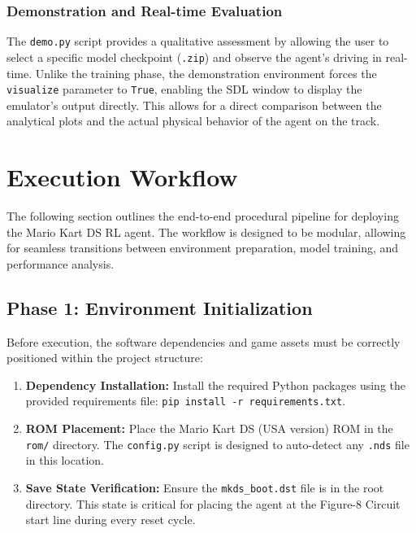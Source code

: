 \documentclass[11pt,a4paper]{article}
\begin{document}
\subsubsection{Demonstration and Real-time Evaluation}
The \texttt{demo.py} script provides a qualitative assessment by allowing the user to select a specific model checkpoint (\texttt{.zip}) and observe the agent's driving in real-time. Unlike the training phase, the demonstration environment forces the \texttt{visualize} parameter to \texttt{True}, enabling the SDL window to display the emulator's output directly. This allows for a direct comparison between the analytical plots and the actual physical behavior of the agent on the track.

\section{Execution Workflow}
The following section outlines the end-to-end procedural pipeline for deploying the Mario Kart DS RL agent. The workflow is designed to be modular, allowing for seamless transitions between environment preparation, model training, and performance analysis.

\subsection{Phase 1: Environment Initialization}
Before execution, the software dependencies and game assets must be correctly positioned within the project structure:
\begin{enumerate}
    \item \textbf{Dependency Installation:} Install the required Python packages using the provided requirements file: \texttt{pip install -r requirements.txt}.
    \item \textbf{ROM Placement:} Place the Mario Kart DS (USA version) ROM in the \texttt{rom/} directory. The \texttt{config.py} script is designed to auto-detect any \texttt{.nds} file in this location.
    \item \textbf{Save State Verification:} Ensure the \texttt{mkds\_boot.dst} file is in the root directory. This state is critical for placing the agent at the Figure-8 Circuit start line during every reset cycle.
\end{enumerate}
\end{document}

